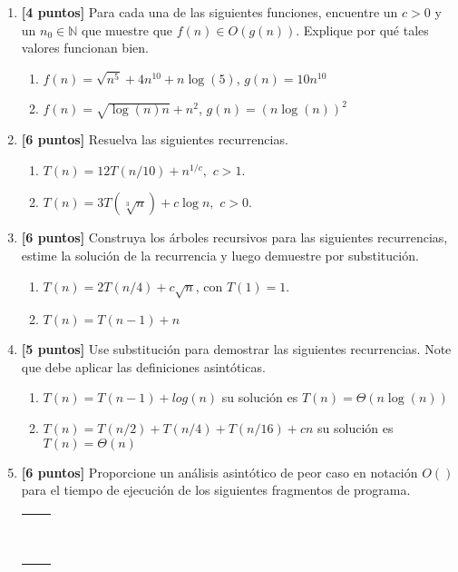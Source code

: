 \documentclass[10pt]{article}
\newcommand{\N}{\mathbb{N}}
\newcommand{\Ot}[1]{O\left(#1\right)}
\begin{document}
\begin{enumerate}
\item \textbf{[4 puntos]}  Para cada una de las siguientes funciones, encuentre un $c>0$ y un $n_0\in\N$ que muestre que $f(n) \in \Ot{g(n)}$. Explique por qué tales valores funcionan bien.

\begin{enumerate}
  \item $f(n) = \sqrt{n^5}+4n^{10}+n\log(5) $, $g(n) = 10n^{10}$
  \item $f(n) = \sqrt{\log(n)n}+n^2$, $g(n) = (n\log(n))^2$
\end{enumerate} 


\item \textbf{[6 puntos]}  Resuelva las siguientes recurrencias.
\begin{enumerate}
  \item $T(n) = 12T\left(n/10\right) + n^{1/c},$ $c>1$.
  \item $T(n) = 3T\left(\sqrt[3]{n}\right) + c\log n,$ $c>0$.
\end{enumerate}

\item \textbf{[6 puntos]} Construya los árboles recursivos para las siguientes recurrencias, estime la solución de la recurrencia y luego demuestre por substitución.

\begin{enumerate}
  \item $T(n) = 2T(n/4) + c\sqrt{n}$, con $T(1) = 1$.
  \item $T(n) = T(n-1) + n$
\end{enumerate}

\item \textbf{[5 puntos]} Use substitución para demostrar las siguientes recurrencias. Note que debe aplicar las definiciones asintóticas. 

\begin{enumerate}
  \item $T(n) = T(n-1) + log(n)$ su solución es $T(n) = \Theta(n\log(n))$
  \item $T(n) = T(n/2) + T(n/4) + T(n/16) +cn$ su solución es $T(n) = \Theta(n)$
\end{enumerate}


\item \textbf{[6 puntos]} Proporcione un análisis asintótico de peor caso en notación $\Ot{}$ para el tiempo de ejecución de los siguientes fragmentos de programa.

\begin{scriptsize}
\begin{tabular}{ll}
\begin{minipage}{3in}
\begin{verbatim}


\end{verbatim}
\end{minipage}
\end{tabular}
\end{scriptsize}
\end{enumerate}
\end{document}
